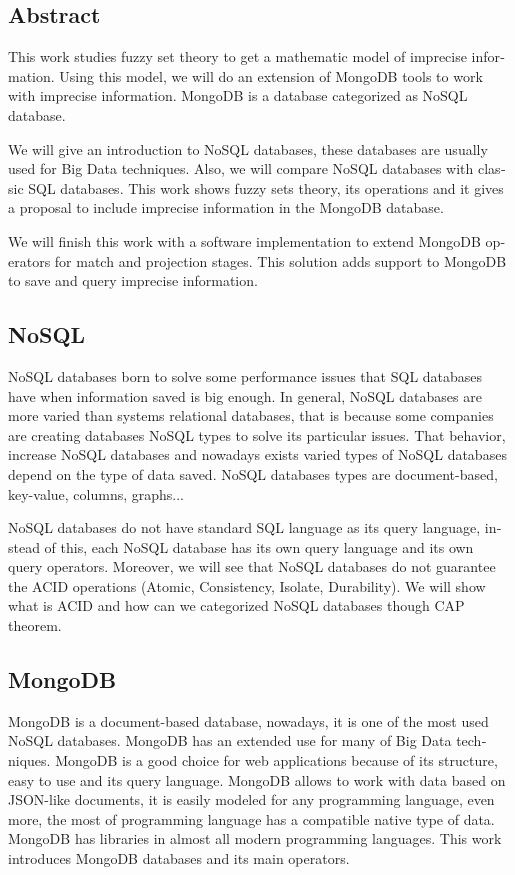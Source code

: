 \begin{otherlanguage}{american}
\section{Abstract}

This work studies fuzzy set theory to get a mathematic model of imprecise information. Using this model, we will do an extension of MongoDB tools to work with imprecise information. MongoDB is a database categorized as NoSQL database.

We will give an introduction to NoSQL databases, these databases are usually used for Big Data techniques. Also, we will compare NoSQL databases with classic SQL databases. This work shows fuzzy sets theory, its operations and it gives a proposal to include imprecise information in the MongoDB database.

We will finish this work with a software implementation to extend MongoDB operators for match and projection stages. This solution adds support to MongoDB to save and query imprecise information.

\subsection{NoSQL}

NoSQL databases born to solve some performance issues that SQL databases have when information saved is big enough. In general, NoSQL databases are more varied than systems relational databases, that is because some companies are creating databases NoSQL types to solve its particular issues. That behavior, increase NoSQL databases and nowadays exists varied types of NoSQL databases depend on the type of data saved. NoSQL databases types are document-based, key-value, columns, graphs...

NoSQL databases do not have standard SQL language as its query language, instead of this, each NoSQL database has its own query language and its own query operators. Moreover, we will see that NoSQL databases do not guarantee the ACID operations (Atomic, Consistency, Isolate, Durability). We will show what is ACID and how can we categorized NoSQL databases though CAP theorem.

\subsection{MongoDB}

MongoDB is a document-based database, nowadays, it is one of the most used NoSQL databases. MongoDB has an extended use for many of Big Data techniques. MongoDB is a good choice for web applications because of its structure, easy to use and its query language. MongoDB allows to work with data based on JSON-like documents, it is easily modeled for any programming language, even more, the most of programming language has a compatible native type of data. MongoDB has libraries in almost all modern programming languages. This work introduces MongoDB databases and its main operators.


\end{otherlanguage}
